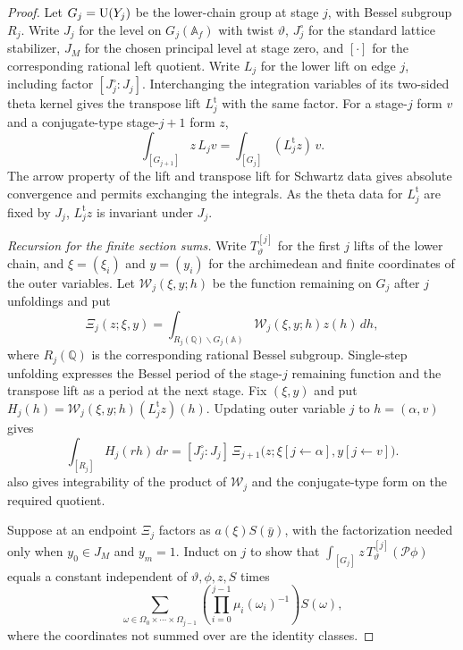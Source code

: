\begin{proof}
Let $G_j=\operatorname{U}(Y_j)$ be the lower-chain group at stage $j$, with Bessel subgroup $R_j$. Write $J_j$ for the level on $G_j(\mathbb A_f)$ with twist $\vartheta$, $J_j^\circ$ for the standard lattice stabilizer, $J_M$ for the chosen principal level at stage zero, and $[\cdot]$ for the corresponding rational left quotient. Write $L_j$ for the lower lift on edge $j$, including factor $[J_j^\circ:J_j]$. Interchanging the integration variables of its two-sided theta kernel gives the transpose lift $L_j^{\mathrm t}$ with the same factor. For a stage-$j$ form $v$ and a conjugate-type stage-$j+1$ form $z$,
\[
 \int_{[G_{j+1}]} z\,L_jv
   =\int_{[G_j]}(L_j^{\mathrm t}z)\,v .
\]
The arrow property of the lift and transpose lift for Schwartz data gives absolute convergence and permits exchanging the integrals. As the theta data for $L_j^{\mathrm t}$ are fixed by $J_j$, $L_j^{\mathrm t}z$ is invariant under $J_j$.

\emph{Recursion for the finite section sums.}
Write $T_\vartheta^{[j]}$ for the first $j$ lifts of the lower chain, and $\xi=(\xi_i)$ and $y=(y_i)$ for the archimedean and finite coordinates of the outer variables. Let $\mathcal W_j(\xi,y;h)$ be the function remaining on $G_j$ after $j$ unfoldings and put
\[
 \Xi_j(z;\xi,y)=\int_{R_j(\mathbb Q)\backslash G_j(\mathbb A)}
                    \mathcal W_j(\xi,y;h)z(h)\,dh ,
\]
where $R_j(\mathbb Q)$ is the corresponding rational Bessel subgroup. Single-step unfolding expresses the Bessel period of the stage-$j$ remaining function and the transpose lift as a period at the next stage. Fix $(\xi,y)$ and put
$H_j(h)=\mathcal W_j(\xi,y;h)(L_j^{\mathrm t}z)(h)$. Updating outer variable $j$ to $h=(\alpha,v)$ gives
\[
 \int_{[R_j]}H_j(rh)\,dr
    =[J_j^\circ:J_j]\,
      \Xi_{j+1}\bigl(z;\xi[j\leftarrow\alpha],y[j\leftarrow v]\bigr).
\]
 also gives integrability of the product of $\mathcal W_j$ and the conjugate-type form on the required quotient.

Suppose at an endpoint $\Xi_j$ factors as $a(\xi)S(\bar y)$, with the factorization needed only when $y_0\in J_M$ and $y_m=1$. Induct on $j$ to show that $\int_{[G_j]}z\,T_\vartheta^{[j]}(\mathcal P\phi)$ equals a constant independent of $\vartheta,\phi,z,S$ times
\[
 \sum_{\omega\in\Omega_0\times\cdots\times\Omega_{j-1}}
   \left(\prod_{i=0}^{j-1}\mu_i(\omega_i)^{-1}\right)S(\omega),
\]
where the coordinates not summed over are the identity classes.


\end{proof}
